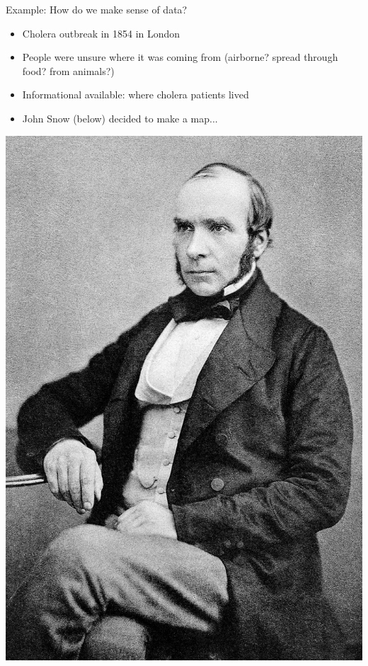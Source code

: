 \documentclass[10pt,t]{beamer}
\begin{document}
\begin{frame}{Example: How do we make sense of data?}

\begin{itemize}
	\item Cholera outbreak in 1854 in London
	\item People were unsure where it was coming from (airborne? spread through food? from animals?)
	\item Informational available: where cholera patients lived
	\item John Snow (below) decided to make a map...
\end{itemize}

\vspace{0.3cm}

\centering \includegraphics[scale=0.17]{johnsnow_epi.jpg} 

\end{frame}
\end{document}
